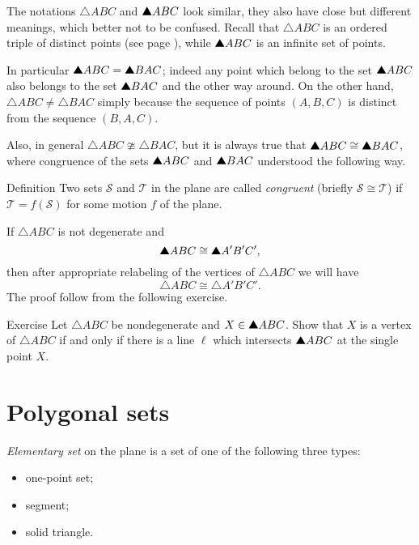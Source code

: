 The notations $\triangle ABC$ and $\solidtriangle ABC$ look similar,
they also have close but different meanings, 
which better not to be confused.
Recall that $\triangle ABC$ is an ordered triple of distinct points
(see page \pageref{page:def:triangle}),
while $\solidtriangle ABC$ is an infinite set of points.

In particular $\solidtriangle ABC=\solidtriangle BAC$; indeed any point which belong to the set $\solidtriangle ABC$ 
also belongs to the set $\solidtriangle BAC$
and the other way around.
On the other hand,
$\triangle ABC\ne\triangle BAC$ simply because the sequence of points $(A,B,C)$ is distinct from the sequence $(B,A,C)$.

Also, in general  $\triangle ABC\ncong\triangle BAC$, but it is always true that $\solidtriangle ABC\cong\solidtriangle BAC$, where congruence of the sets $\solidtriangle ABC$ and $\solidtriangle BAC$ understood the following way.

\begin{thm}{Definition}\label{def:cong-sets}
Two sets $\mathcal{S}$ and $\mathcal{T}$ in the plane  
are called \emph{congruent} 
(briefly $\mathcal{S}\cong \mathcal{T}$)
if 
$\mathcal{T}=f(\mathcal{S})$ for some motion $f$ of the plane.
\end{thm}

If $\triangle ABC$ is not degenerate
and \[\solidtriangle ABC\cong \solidtriangle A'B'C',\]
then after appropriate relabeling of the vertices of $\triangle ABC$ 
we will have 
\[\triangle ABC\cong \triangle A'B'C'.\]
The proof follow from the following exercise.

\begin{thm}{Exercise}\label{ex:vertex}
Let $\triangle ABC$ be nondegenerate and $X\z\in \solidtriangle ABC$.
Show that $X$ is a vertex of $\triangle ABC$
if and only if there is a line $\ell$ which intersects $\solidtriangle ABC$
at the single point $X$.
\end{thm}

\section*{Polygonal sets}

\emph{Elementary set} on the plane 
is a set of one of the following three types:
\begin{itemize}
 \item one-point set;
 \item segment;
 \item solid triangle.
\end{itemize}

